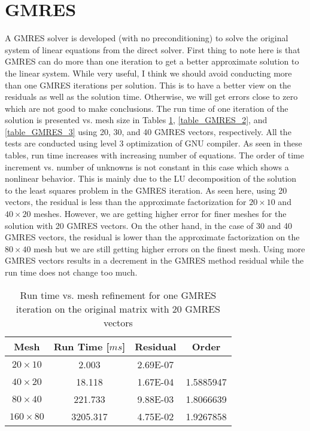 \documentclass{article}
\begin{document}
\section{GMRES}
A GMRES solver is developed (with no preconditioning) to solve the original system of linear equations from the direct solver. First thing to note here is that GMRES can do more than one iteration to get a better approximate solution to the linear system. While very useful, I think we should avoid conducting more than one GMRES iterations per solution. This is to have a better view on the residuals as well as the solution time. Otherwise, we will get errors close to zero which are not good to make conclusions. The run time of one iteration of the solution is presented vs. mesh size in Tables \ref{table_GMRES_1}, \ref{table_GMRES_2}, and \ref{table_GMRES_3} using 20, 30, and 40 GMRES vectors, respectively. All the tests are conducted using level 3 optimization of GNU compiler. As seen in these tables, run time increases with increasing number of equations. The order of time increment vs. number of unknowns is not constant in this case which shows a nonlinear behavior. This is mainly due to the LU decomposition of the solution to the least squares problem in the GMRES iteration. As seen here, using 20 vectors, the residual is less than the approximate factorization for $20 \times 10$ and $40 \times 20$ meshes. However, we are getting higher error for finer meshes for the solution with 20 GMRES vectors. On the other hand, in the case of 30 and 40 GMRES vectors, the residual is lower than the approximate factorization on the $80 \times 40$ mesh but we are still getting higher errors on the finest mesh. Using more GMRES vectors results in a decrement in the GMRES method residual while the run time does not change too much.

\begin{table}[H]
\centering
\caption{Run time vs. mesh refinement for one GMRES iteration on the original matrix with 20 GMRES vectors}
\label{table_GMRES_1}
\begin{tabular}{cccc}
\hline
Mesh & Run Time [$m s$] & Residual & Order\\
\hline\hline
$20 \times 10$  & 2.003    & 2.69E-07 &           \\
$40 \times 20$  & 18.118   & 1.67E-04 & 1.5885947 \\
$80 \times 40$  & 221.733  & 9.88E-03 & 1.8066639 \\
$160 \times 80$ & 3205.317 & 4.75E-02 & 1.9267858 \\
\hline
\end{tabular}
\end{table}
\end{document}
